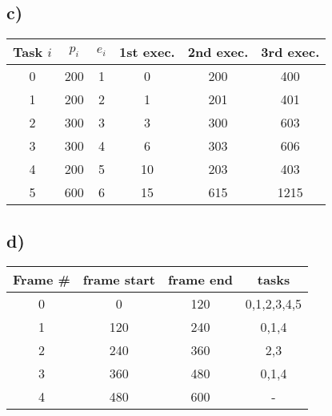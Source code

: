 \documentclass[10pt,a4paper]{article}
\begin{document}
\subsection*{c)}

\begin{tabular}{| c | c | c || c | c | c |}
  \hline
  Task $i$ & $p_i$ & $e_i$ & 1st exec. & 2nd exec. & 3rd exec. \\
  \hline
  0 & 200 & 1 & 0 & 200 & 400 \\
  \hline
  1 & 200 & 2 & 1 & 201 & 401 \\
  \hline
  2 & 300 & 3 & 3 & 300 & 603 \\
  \hline
  3 & 300 & 4 & 6 & 303 & 606 \\
  \hline
  4 & 200 & 5 & 10 & 203 & 403 \\
  \hline
  5 & 600 & 6 & 15 & 615 & 1215 \\
  \hline
\end{tabular}

\subsection*{d)}
\begin{tabular}{| c | c | c | c |}
\hline
Frame \# & frame start & frame end & tasks \\
\hline
0 & 0 & 120 & 0,1,2,3,4,5 \\
\hline
1 & 120 & 240 & 0,1,4 \\
\hline
2 & 240 & 360 & 2,3 \\
\hline
3 & 360 & 480 & 0,1,4 \\
\hline
4 & 480 & 600 & - \\
\hline
\end{tabular}
\end{document}

